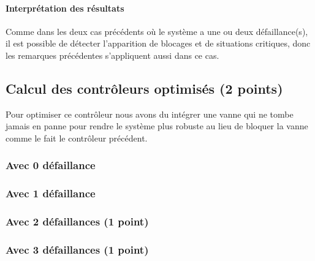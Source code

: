 \documentclass[a4paper]{book}
\begin{document}
\paragraph{Interprétation des résultats}
Comme dans les deux cas précédents où le système a une ou deux défaillance(s), il est possible de détecter l’apparition de blocages et de situations critiques, donc les remarques précédentes s’appliquent aussi dans ce cas.\

\subsection{Calcul des contrôleurs optimisés (2 points)}
Pour optimiser ce contrôleur nous avons du intégrer une vanne qui ne tombe jamais en panne pour rendre le système plus robuste au lieu de bloquer la vanne comme le fait le contrôleur précédent. 

\subsubsection{Avec 0 défaillance}






\subsubsection{Avec 1 défaillance }






\subsubsection{Avec 2 défaillances (1 point)}






\subsubsection{Avec 3 défaillances (1 point)}





\end{document}
